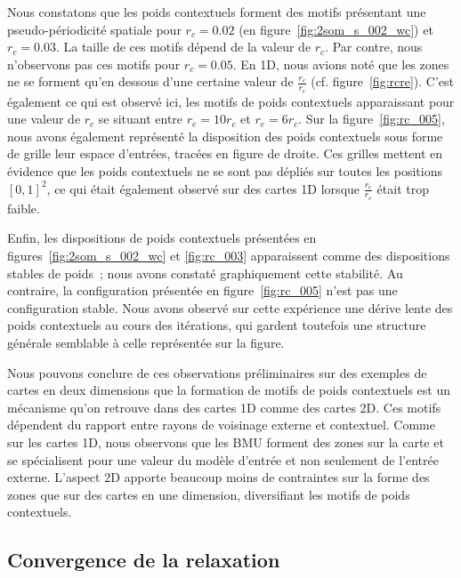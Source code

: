 \documentclass[../main]{subfiles}
\begin{document}
Nous constatons que les poids contextuels forment des motifs présentant une pseudo-périodicité spatiale pour $r_c = 0.02$ (en figure~\ref{fig:2som_s_002_wc}) et $r_c = 0.03$. La taille de ces motifs dépend de la valeur de $r_c$. Par contre, nous n'observons pas ces motifs pour $r_c = 0.05$.
En 1D, nous avions noté que les zones ne se forment qu'en dessous d'une certaine valeur de $\frac{r_e}{r_c}$ (cf. figure~\ref{fig:rcre}). C'est également ce qui est observé ici, les motifs de poids contextuels apparaissant pour une valeur de $r_c$ se situant entre $r_e = 10 r_c$ et $r_e = 6 r_c$.
Sur la figure~\ref{fig:rc_005}, nous avons également représenté la disposition des poids contextuels sous forme de grille leur espace d'entrées, tracées en figure de droite.
Ces grilles mettent en évidence que les poids contextuels ne se sont pas dépliés sur toutes les positions $[0,1]^2$, ce qui était également observé sur des cartes 1D lorsque $\frac{r_e}{r_c}$ était trop faible.


Enfin, les dispositions de poids contextuels présentées en figures~\ref{fig:2som_s_002_wc} et \ref{fig:rc_003} apparaissent comme des dispositions stables de poids~; nous avons constaté graphiquement cette stabilité. Au contraire, la configuration présentée en figure~\ref{fig:rc_005} n'est pas une configuration stable. Nous avons observé sur cette expérience une dérive lente des poids contextuels au cours des itérations, qui gardent toutefois une structure générale semblable à celle représentée sur la figure.

Nous pouvons conclure de ces observations préliminaires sur des exemples de cartes en deux dimensions que la formation de motifs de poids contextuels est un mécanisme qu'on retrouve dans des cartes 1D comme des cartes 2D.
Ces motifs dépendent du rapport entre rayons de voisinage externe et contextuel.
Comme sur les cartes 1D, nous observons que les BMU forment des zones sur la carte et se spécialisent pour une valeur du modèle d'entrée et non seulement de l'entrée externe.
L'aspect 2D apporte beaucoup moins de contraintes sur la forme des zones que sur des cartes en une dimension, diversifiant les motifs de poids contextuels.


\subsection{Convergence de la relaxation \label{par:conv2D}}
\end{document}
